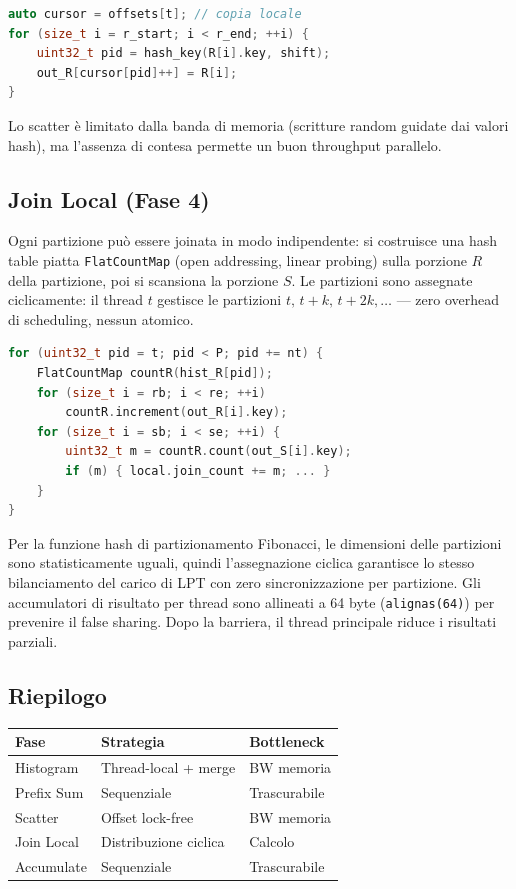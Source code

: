 \documentclass[10pt,a4paper,twocolumn]{article}
\begin{document}
\begin{lstlisting}[language=C++]
auto cursor = offsets[t]; // copia locale
for (size_t i = r_start; i < r_end; ++i) {
    uint32_t pid = hash_key(R[i].key, shift);
    out_R[cursor[pid]++] = R[i];
}
\end{lstlisting}

Lo scatter è limitato dalla banda di memoria (scritture random guidate dai valori hash), ma l'assenza di contesa permette un buon throughput parallelo.

\subsection*{Join Local (Fase 4)}

Ogni partizione può essere joinata in modo indipendente: si costruisce una hash table piatta \texttt{FlatCountMap} (open addressing, linear probing) sulla porzione $R$ della partizione, poi si scansiona la porzione $S$. Le partizioni sono assegnate ciclicamente: il thread $t$ gestisce le partizioni $t,\,t{+}k,\,t{+}2k,\ldots$ — zero overhead di scheduling, nessun atomico.

\begin{lstlisting}[language=C++]
for (uint32_t pid = t; pid < P; pid += nt) {
    FlatCountMap countR(hist_R[pid]);
    for (size_t i = rb; i < re; ++i)
        countR.increment(out_R[i].key);
    for (size_t i = sb; i < se; ++i) {
        uint32_t m = countR.count(out_S[i].key);
        if (m) { local.join_count += m; ... }
    }
}
\end{lstlisting}

Per la funzione hash di partizionamento Fibonacci, le dimensioni delle partizioni sono statisticamente uguali, quindi l'assegnazione ciclica garantisce lo stesso bilanciamento del carico di LPT con zero sincronizzazione per partizione. Gli accumulatori di risultato per thread sono allineati a 64 byte (\texttt{alignas(64)}) per prevenire il false sharing. Dopo la barriera, il thread principale riduce i risultati parziali.

\subsection*{Riepilogo}

\begin{center}
\small
\begin{tabular}{@{}lll@{}}
\toprule
Fase & Strategia & Bottleneck \\
\midrule
Histogram   & Thread-local + merge & BW memoria \\
Prefix Sum  & Sequenziale          & Trascurabile \\
Scatter     & Offset lock-free     & BW memoria \\
Join Local  & Distribuzione ciclica & Calcolo \\
Accumulate  & Sequenziale          & Trascurabile \\
\bottomrule
\end{tabular}
\end{center}
\end{document}
